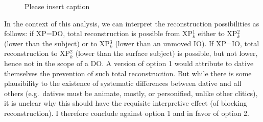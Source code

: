 \documentclass[output=paper]{langsci/langscibook}
\begin{document}
\begin{figure}
    \caption{{\color{red}Please insert caption}\label{fig:fromex:clitics}}
\end{figure}

In the context of this analysis, we can interpret the reconstruction
possibilities as follows: if XP=DO, total reconstruction is possible from
XP$_k^1$ either to XP$_k^2$   (lower than the subject) or to XP$_k^3$ (lower
than an unmoved IO). If XP=IO, total reconstruction to  XP$_k^2$ (lower than
the surface subject) is possible, but not lower, hence not in the scope of a
DO.  A version of option 1 would attribute to dative  themselves the
prevention of such total reconstruction. But while there is some plausibility
to the existence of systematic differences between dative  and all
others (e.g.\ datives must be animate, mostly, or personified, unlike other
clitics), it is unclear why this should have the requisite interpretive effect
(of blocking reconstruction). I therefore conclude against option 1 and in
favor of option 2.
\end{document}
